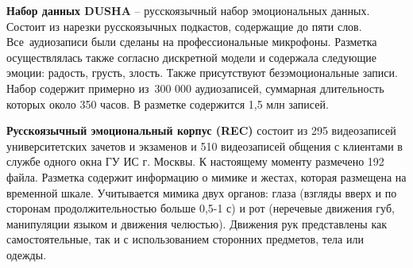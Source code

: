 \textbf{Набор данных DUSHA} \cite{dusha} -- русскоязычный набор эмоциональных данных. Состоит из нарезки русскоязычных подкастов, содержащие до пяти слов. Все аудиозаписи были сделаны на профессиональные микрофоны. Разметка осуществлялась также согласно дискретной модели и содержала следующие эмоции: радость, грусть, злость. Также присутствуют безэмоциональные записи. Набор содержит примерно из 300 000 аудиозаписей, суммарная длительность которых около 350 часов. В разметке содержится 1,5 млн записей. 

\textbf{Русскоязычный эмоциональный корпус (REC)} состоит из 295 видеозаписей университетских зачетов и экзаменов и 510 видеозаписей общения с клиентами в службе одного окна ГУ ИС г. Москвы. К настоящему моменту размечено 192 файла. Разметка содержит информацию о мимике и жестах, которая размещена на временной шкале. Учитывается мимика двух органов: глаза (взгляды вверх и по сторонам продолжительностью больше 0,5-1 с) и рот (неречевые движения губ, манипуляции языком и движения челюстью). Движения рук представлены как самостоятельные, так и с использованием сторонних предметов, тела или одежды.

